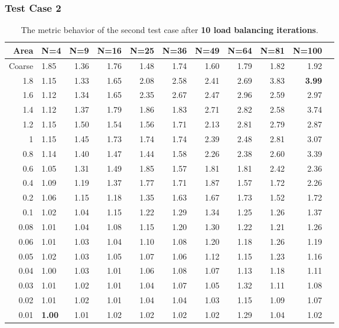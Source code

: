 \documentclass[]{beamer}
\begin{document}
\begin{frame}[t]\frametitle{Test Case 2}
\begin{table}[H]
\centering
\tiny
\caption{The metric behavior of the second test case after \textbf{10 load balancing iterations}.} 
\begin{tabular}{rlrrrrrrrrr}
  \hline
 Area & N=4 & N=9 & N=16 & N=25 & N=36 & N=49 & N=64 & N=81 & N=100 \\ 
  \hline
 Coarse & 1.85 & 1.36 & 1.76 & 1.48 & 1.74 & 1.60 & 1.79 & 1.82 & 1.92 \\ 
   1.8 & 1.15 & 1.33 & 1.65 & 2.08 & 2.58 & 2.41 & 2.69 & 3.83 & \textbf{\cellcolor{blue!25}3.99} \\ 
 1.6 & 1.12 & 1.34 & 1.65 & 2.35 & 2.67 & 2.47 & 2.96 & 2.59 & 2.97 \\ 
1.4 & 1.12 & 1.37 & 1.79 & 1.86 & 1.83 & 2.71 & 2.82 & 2.58 & 3.74 \\ 
 1.2 & 1.15 & 1.50 & 1.54 & 1.56 & 1.71 & 2.13 & 2.81 & 2.79 & 2.87 \\ 
 1 & 1.15 & 1.45 & 1.73 & 1.74 & 1.74 & 2.39 & 2.48 & 2.81 & 3.07 \\ 
0.8 & 1.14 & 1.40 & 1.47 & 1.44 & 1.58 & 2.26 & 2.38 & 2.60 & 3.39 \\ 
 0.6 & 1.05 & 1.31 & 1.49 & 1.85 & 1.57 & 1.81 & 1.81 & 2.42 & 2.36 \\ 
 0.4 & 1.09 & 1.19 & 1.37 & 1.77 & 1.71 & 1.87 & 1.57 & 1.72 & 2.26 \\ 
 0.2 & 1.06 & 1.15 & 1.18 & 1.35 & 1.63 & 1.67 & 1.73 & 1.52 & 1.72 \\ 
 0.1 & 1.02 & 1.04 & 1.15 & 1.22 & 1.29 & 1.34 & 1.25 & 1.26 & 1.37 \\ 
   0.08 & 1.01 & 1.04 & 1.08 & 1.15 & 1.20 & 1.30 & 1.22 & 1.21 & 1.26 \\ 
0.06 & 1.01 & 1.03 & 1.04 & 1.10 & 1.08 & 1.20 & 1.18 & 1.26 & 1.19 \\ 
   0.05 & 1.02 & 1.03 & 1.05 & 1.07 & 1.06 & 1.12 & 1.15 & 1.23 & 1.16 \\ 
  0.04 & 1.00 & 1.03 & 1.01 & 1.06 & 1.08 & 1.07 & 1.13 & 1.18 & 1.11 \\ 
 0.03 & 1.01 & 1.02 & 1.01 & 1.04 & 1.07 & 1.05 & 1.32 & 1.11 & 1.08 \\ 
  0.02 & 1.01 & 1.02 & 1.01 & 1.04 & 1.04 & 1.03 & 1.15 & 1.09 & 1.07 \\ 
 0.01 & \textbf{\cellcolor{blue!25}1.00} & 1.01 & 1.02 & 1.02 & 1.02 & 1.02 & 1.29 & 1.04 & 1.02 \\ 
   \hline
\end{tabular}
\end{table}
\end{frame}
\end{document}
